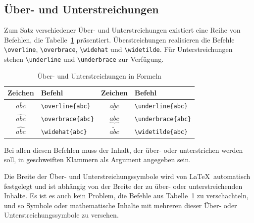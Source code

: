\documentclass[a4paper,10pt,twoside]{scrbook}
\begin{document}
{\subsection{Über- und Unterstreichungen}

Zum Satz verschiedener Über- und Unterstreichungen
existiert eine Reihe von Befehlen, die Tabelle~\ref{Tabelle_Ueberstreichungen_Unterstreichungen} präsentiert. 
Überstreichungen realisieren die Befehle
\verb!\overline!, 
\verb!\overbrace!, 
\verb!\widehat! und
\verb!\widetilde!. 
Für Unterstreichungen stehen 
\verb!\underline! und
\verb!\underbrace! zur Verfügung.

\begin{table}[h!tb]
\centering
\caption{Über- und Unterstreichungen in Formeln}
\label{Tabelle_Ueberstreichungen_Unterstreichungen}       %
\begin{tabular}{clcl}
\hline
Zeichen & Befehl & Zeichen & Befehl  \\
\hline
$\overline{abc}$ & \texttt{\textbackslash overline\{abc\}} & 
$\underline{abc}$ & \texttt{\textbackslash underline\{abc\}} \\
$\overbrace{abc}$ & \texttt{\textbackslash overbrace\{abc\}} &
$\underbrace{abc}$ & \texttt{\textbackslash underbrace\{abc\}} \\
$\widehat{abc}$ & \texttt{\textbackslash widehat\{abc\}} &
$\widetilde{abc}$ & \texttt{\textbackslash widetilde\{abc\}} \\
\hline
\end{tabular}
\end{table}


Bei allen diesen Befehlen muss der Inhalt, der über- oder unterstrichen
werden soll, in geschweiften Klammern als Argument angegeben sein. 

Die Breite der Über- und Unterstreichungssymbole
wird von \LaTeX\ automatisch festgelegt und
ist abhängig von der Breite der zu über- oder unterstreichenden Inhalte.
Es ist es auch kein Problem, die
Befehle aus Tabelle~\ref{Tabelle_Ueberstreichungen_Unterstreichungen} zu verschachteln, und so Symbole 
oder mathematische Inhalte mit mehreren dieser
Über- oder Unterstreichungssymbole zu versehen. 

}
\end{document}
